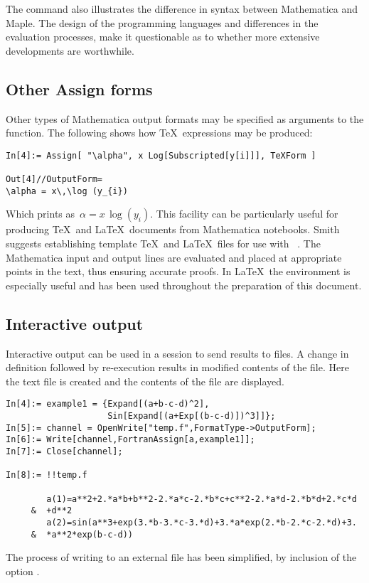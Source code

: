 \documentclass [12pt,twoside]{article}
\begin{document}
The command  also illustrates the difference in syntax between
Mathematica and Maple. The design of the programming languages and differences in
the evaluation processes, make it questionable as to whether more extensive
developments are worthwhile.

\pagebreak[2]

\subsection{Other Assign forms}

Other types of Mathematica output formats may be specified as arguments to the
 function. The following shows how \TeX \ expressions may be produced:
\begin{verbatim}
In[4]:= Assign[ "\alpha", x Log[Subscripted[y[i]]], TeXForm ]

Out[4]//OutputForm=
\alpha = x\,\log (y_{i})
\end{verbatim}
Which prints as~$\alpha = x\,\log (y_{i})$. This facility can be
particularly useful for producing \TeX \ and \LaTeX \ documents from
Mathematica notebooks. Smith suggests establishing template \TeX \ and \LaTeX \
files for use with ~\cite{camsm-93}. The Mathematica input and output
lines are evaluated and placed at appropriate points in the text, thus ensuring
accurate proofs. In \LaTeX \ the \mma{inverbatim} environment is especially
useful and has been used throughout the preparation of this document.

\pagebreak[2]

\subsection{Interactive output}

Interactive output can be used in a session to send results to files. A change in
definition followed by re-execution results in modified contents of the file.
Here the text file \mma{temp.f} is created and the contents of the file are
displayed.
\begin{verbatim}
In[4]:= example1 = {Expand[(a+b-c-d)^2],
                    Sin[Expand[(a+Exp[(b-c-d)])^3]]};
In[5]:= channel = OpenWrite["temp.f",FormatType->OutputForm];
In[6]:= Write[channel,FortranAssign[a,example1]];
In[7]:= Close[channel];

In[8]:= !!temp.f

        a(1)=a**2+2.*a*b+b**2-2.*a*c-2.*b*c+c**2-2.*a*d-2.*b*d+2.*c*d
     &  +d**2
        a(2)=sin(a**3+exp(3.*b-3.*c-3.*d)+3.*a*exp(2.*b-2.*c-2.*d)+3.
     &  *a**2*exp(b-c-d))
\end{verbatim}
The process of writing to an external file has been simplified, by inclusion
of the option \mma{AssignToFile}.
\end{document}
